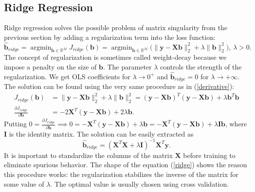 \documentclass[11pt,american]{book} %
\theoremstyle{plain}
\theoremstyle{definition}
\DeclareMathOperator*{\argmin}{argmin} %
\begin{document}
\subsection{Ridge Regression} \label{RR}
Ridge regression solves the possible problem of matrix singularity from the previous section by adding a regularization term into the loss function:
\begin{equation}
	\bm{\hat{b}}_{ridge} =\argmin_{\bm{b} \in \mathbb{R}^{M}} J_{ridge}(\bm{b}) = \argmin_{\bm{b} \in \mathbb{R}^{M}} \Big( \lVert \bm{y} -\bm{X}\bm{b}\rVert_{2}^2 + \lambda \lVert \bm{b} \rVert^2_{2} \Big), \, \lambda>0. \label{ridge_regression}
\end{equation}
The concept of regularization is sometimes called weight-decay because we impose a penalty on the size of $\bm{b}$. The parameter $\lambda$ controls the strength of the regularization. We get OLS coefficients for $\lambda \rightarrow 0^{+}$ and $\bm{\hat{b}}_{ridge}=0$ for $\lambda \rightarrow +\infty$. The solution can be found using the very same procedure as in (\ref{derivative}):
\begin{equation}
	\begin{aligned}
		J_{ridge}(\bm{b}) &=  \lVert \bm{y} - \bm{X}\bm{b}\rVert_{2}^2 + \lambda \lVert \bm{b} \rVert^2_{2} = ( \bm{y}- \bm{X}\bm{b})^{T} (\bm{y} -\bm{X}\bm{b}) + \lambda \bm{b}^T \bm{b} \\
		\frac{\partial J_{ridge}} {\partial \bm{b}} &= -2 \bm{X}^T (\bm{y} -\bm{X}\bm{b}) + 2\lambda \bm{b}.
	\end{aligned}
	\label{derivative_ridge}
\end{equation}
Putting $0 = \frac{\partial J_{ridge}} {\partial \bm{b}} \implies 0 =  -\bm{X}^T (\bm{y} -\bm{X}\bm{b}) + \lambda \bm{b} = -\bm{X}^T (\bm{y} -\bm{X}\bm{b}) + \lambda \bm{I}\bm{b}$, where $\bm{I}$ is the identity matrix. The solution can be easily extracted as
\begin{equation}
	\bm{\hat{b}}_{ridge} = (\bm{X}^T \bm{X} + \lambda \bm{I})^{-1} \bm{X}^T \bm{y}.
	\label{ridge}
\end{equation}
It is important to standardize the columns of the matrix $\bm{X}$ before training to eliminate spurious behavior. The shape of the equation (\ref{ridge}) shows the reason this procedure works: the regularization stabilizes the inverse of the matrix for some value of $\lambda$. The optimal value is usually chosen using cross validation.
\end{document}
